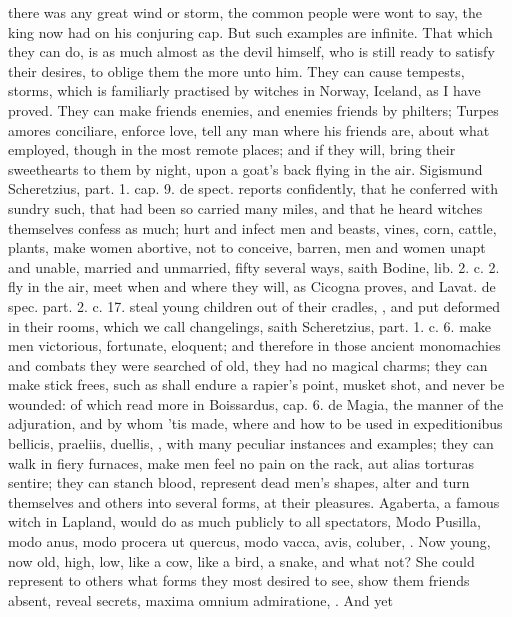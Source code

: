{{there was any great wind or storm, the common people were wont to say,
the king now had on his conjuring cap. But such examples are infinite.
That which they can do, is as much almost as the devil himself, who is
still ready to satisfy their desires, to oblige them the more unto him.
They can cause tempests, storms, which is familiarly practised by
witches in Norway, Iceland, as I have proved. They can make friends
enemies, and enemies friends by philters; Turpes amores
conciliare, enforce love, tell any man where his friends are, about
what employed, though in the most remote places; and if they will,
bring their sweethearts to them by night, upon a goat's back
flying in the air. Sigismund Scheretzius, part. 1. cap. 9. de spect.
reports confidently, that he conferred with sundry such, that had been
so carried many miles, and that he heard witches themselves confess as
much; hurt and infect men and beasts, vines, corn, cattle, plants, make
women abortive, not to conceive, barren, men and women unapt and
unable, married and unmarried, fifty several ways, saith Bodine, lib.
2. c. 2. fly in the air, meet when and where they will, as Cicogna
proves, and Lavat. \textlatin{de spec}. part. 2. c. 17. steal young children out of
their cradles, , and put deformed in their rooms,
which we call changelings, saith Scheretzius, part. 1. c. 6. make
men victorious, fortunate, eloquent; and therefore in those ancient
monomachies and combats they were searched of old, they had no
magical charms; they can make stick frees, such as shall endure a
rapier's point, musket shot, and never be wounded: of which read more
in Boissardus, cap. 6. de Magia, the manner of the adjuration, and by
whom 'tis made, where and how to be used in expeditionibus bellicis,
praeliis, duellis, \etc{}, with many peculiar instances and examples; they
can walk in fiery furnaces, make men feel no pain on the rack, aut
alias torturas sentire; they can stanch blood, represent dead
men's shapes, alter and turn themselves and others into several forms,
at their pleasures. Agaberta, a famous witch in Lapland, would do
as much publicly to all spectators, Modo Pusilla, modo anus, modo
procera ut quercus, modo vacca, avis, coluber, \etc{}. Now young, now old,
high, low, like a cow, like a bird, a snake, and what not? She could
represent to others what forms they most desired to see, show them
friends absent, reveal secrets, maxima omnium admiratione, \etc{}. And yet
}}
